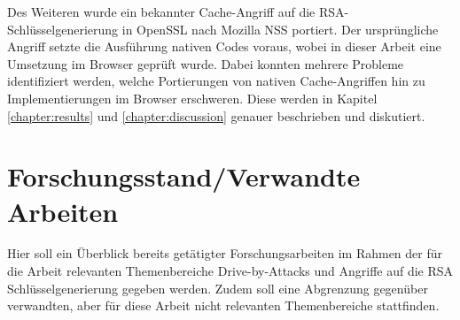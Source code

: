Des Weiteren wurde ein bekannter Cache-Angriff auf die RSA-Schlüsselgenerierung in OpenSSL nach Mozilla NSS portiert.
Der ursprüngliche Angriff setzte die Ausführung nativen Codes voraus, wobei in dieser Arbeit eine Umsetzung im Browser geprüft wurde.
Dabei konnten mehrere Probleme identifiziert werden, welche Portierungen von nativen Cache-Angriffen hin zu Implementierungen im Browser erschweren. 
Diese werden in Kapitel \ref{chapter:results} und \ref{chapter:discussion} genauer beschrieben und diskutiert.

\section{Forschungsstand/Verwandte Arbeiten}
\label{related_work}

Hier soll ein Überblick bereits getätigter Forschungsarbeiten im Rahmen der für die Arbeit relevanten Themenbereiche %
Drive-by-Attacks 
und Angriffe auf die RSA Schlüsselgenerierung gegeben werden. Zudem soll eine Abgrenzung gegenüber verwandten, aber für diese Arbeit nicht relevanten Themenbereiche stattfinden.



